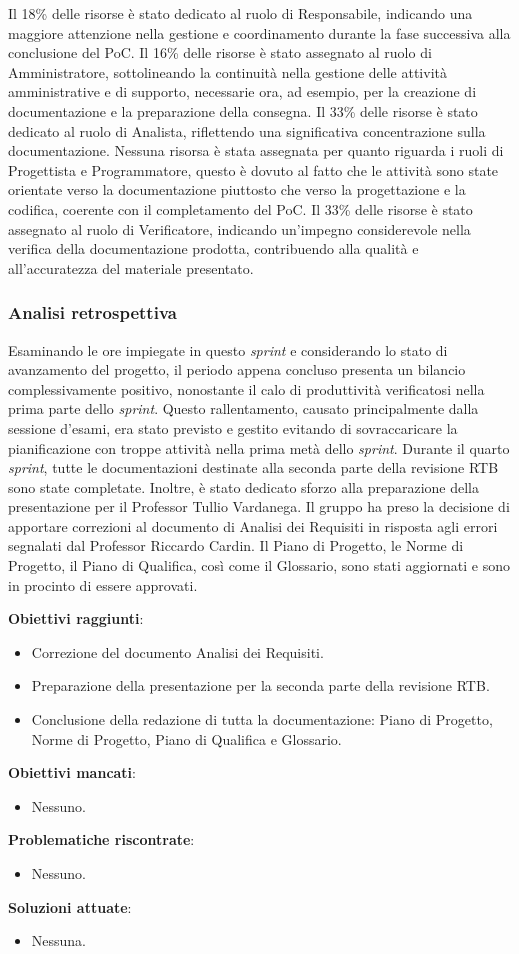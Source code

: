 Il 18\% delle risorse è stato dedicato al ruolo di Responsabile, indicando una maggiore attenzione nella gestione e coordinamento
durante la fase successiva alla conclusione del PoC.
Il 16\% delle risorse è stato assegnato al ruolo di Amministratore, sottolineando la continuità nella gestione delle attività amministrative e di supporto, necessarie ora, ad esempio, per la creazione di documentazione e la preparazione della consegna.
Il 33\% delle risorse è stato dedicato al ruolo di Analista, riflettendo una significativa concentrazione sulla documentazione.
Nessuna risorsa è stata assegnata per quanto riguarda i ruoli di Progettista e Programmatore, questo è dovuto al fatto che le attività sono state orientate verso la documentazione piuttosto che verso la progettazione e la codifica, coerente con il completamento del PoC.
Il 33\% delle risorse è stato assegnato al ruolo di Verificatore, indicando un'impegno considerevole nella verifica della documentazione prodotta, contribuendo alla qualità e all'accuratezza del materiale presentato.

\subsubsection{Analisi retrospettiva}

Esaminando le ore impiegate in questo \textit{sprint} e considerando lo stato di avanzamento del progetto, il periodo appena concluso presenta un bilancio complessivamente positivo,
nonostante il calo di produttività verificatosi nella prima parte dello \textit{sprint}. Questo rallentamento, causato principalmente dalla sessione d'esami, era stato previsto e gestito evitando
di sovraccaricare la pianificazione con troppe attività nella prima metà dello \textit{sprint}.
Durante il quarto \textit{sprint}, tutte le documentazioni destinate alla seconda parte della revisione RTB sono state completate. Inoltre, è stato dedicato sforzo alla preparazione della
presentazione per il Professor Tullio Vardanega. Il gruppo ha preso la decisione di apportare correzioni al documento di Analisi dei Requisiti in
risposta agli errori segnalati dal Professor Riccardo Cardin.
Il Piano di Progetto, le Norme di Progetto, il Piano di Qualifica, così come il Glossario, sono stati aggiornati e sono in procinto di essere approvati.

\textbf{Obiettivi raggiunti}:
\begin{itemize}
	\item Correzione del documento Analisi dei Requisiti.
	\item Preparazione della presentazione per la seconda parte della revisione RTB.
	\item Conclusione della redazione di tutta la documentazione: Piano di Progetto, Norme di Progetto, Piano di Qualifica e Glossario.
\end{itemize}

\textbf{Obiettivi mancati}:
\begin{itemize}
	\item Nessuno.
\end{itemize}

\textbf{Problematiche riscontrate}:
\begin{itemize}
	\item Nessuno.
\end{itemize}

\textbf{Soluzioni attuate}:
\begin{itemize}
	\item Nessuna.
\end{itemize}

